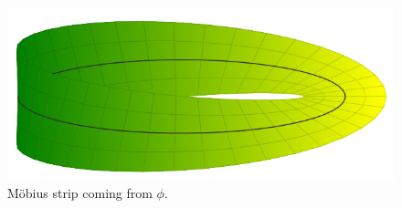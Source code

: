 \documentclass[notoc,notitlepage]{tufte-book}
\begin{document}
\begin{eg}
\begin{figure}[ht]
    \centering
    \includegraphics[width=\linewidth]{images/mobius_angle1.png}
    
    \caption{M\"{o}bius strip coming from $\phi$.}
    \label{fig:mobius_strip_coming_from_phi_}
  \end{figure}


\end{eg}
\end{document}
